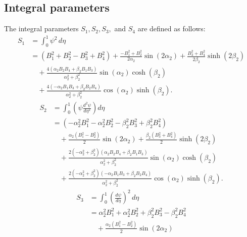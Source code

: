 \documentclass[preprint,12pt]{elsarticle}
\begin{document}
\FloatBarrier
\begin{appendices}
\renewcommand{\theequation}{\thesection.\arabic{equation}}
\section{Integral parameters}\label{appendA}
The integral parameters \( S_1, S_2, S_3, \) and \( S_4 \) are defined as follows:
%
\begin{equation}\label{eq:inte_phi}
	\begin{aligned}
		S_1 &= \int_{0}^{1} \psi^2 \, d\eta \\
		&= (B_1^2 + B_2^2 - B_3^2 + B_4^2) 
		+ \frac{-B_1^2 + B_2^2}{2\alpha_2} \sin(2\alpha_2) 
		+ \frac{B_3^2 + B_4^2}{2\beta_2} \sinh(2\beta_2) \\
		&\quad + \frac{4(\alpha_2 B_2B_4 + \beta_2 B_1B_3)}{\alpha_2^2 + \beta_2^2} \sin(\alpha_2) \cosh(\beta_2) \\
		&\quad + \frac{4(-\alpha_2 B_1B_3 + \beta_2 B_2B_4)}{\alpha_2^2 + \beta_2^2} \cos(\alpha_2) \sinh(\beta_2).
	\end{aligned}
\end{equation}
%
\begin{equation}\label{eq:inte_dphi2}
\begin{split}
	S_2 &= \int_{0}^{1} \left( \psi \frac{d^2 \psi}{d \eta^2} \right) d \eta \\
	&= \left( -\alpha_2^2 B_1^2 - \alpha_2^2 B_2^2 - \beta_2^2 B_3^2 + \beta_2^2 B_4^2 \right) \\
	&\quad + \frac{\alpha_2 (B_1^2 - B_2^2)}{2} \sin(2 \alpha_2) 
	 + \frac{\beta_2 (B_3^2 + B_4^2)}{2} \sinh(2 \beta_2) \\
	&\quad + \frac{2(-\alpha_2^2 + \beta_2^2) (\alpha_2 B_2 B_4 + \beta_2 B_1 B_3)}{\alpha_2^2 + \beta_2^2} \sin(\alpha_2) \cosh(\beta_2) \\
	&\quad + \frac{2(-\alpha_2^2 + \beta_2^2) (-\alpha_2 B_1 B_3 + \beta_2 B_2 B_4)}{\alpha_2^2 + \beta_2^2} \cos(\alpha_2) \sinh(\beta_2).
\end{split}
\end{equation}
%
\begin{equation}\label{eq:inte_dphi3}
	\begin{aligned}
		S_3 &= \int_{0}^{1} \left(\frac{d\psi}{d\eta}\right)^2 \, d\eta \\
		&= \alpha_2^2 B_1^2 + \alpha_2^2 B_2^2 + \beta_2^2 B_3^2 - \beta_2^2 B_4^2 \\
		&\quad + \frac{\alpha_2 (B_1^2 - B_2^2)}{2} \sin(2\alpha_2) 

\end{aligned}
\end{equation}
\end{appendices}
\end{document}
